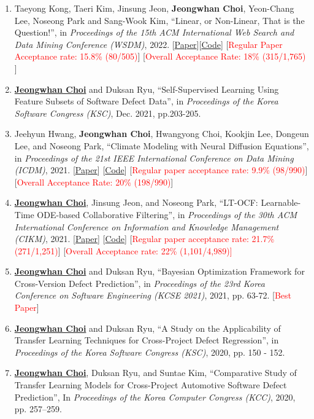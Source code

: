 \documentclass[10pt]{article}
\newenvironment{changemargin}[2]{
  \begin{list}{}{
    \setlength{\topsep}{0pt}
    \setlength{\leftmargin}{#1}
    \setlength{\rightmargin}{#2}
    \setlength{\listparindent}{\parindent}
    \setlength{\itemindent}{\parindent}
    \setlength{\parsep}{\parskip}
  }
  \item[]}{\end{list}
}
\newcommand{\RED}[1]{\textcolor{red}{#1}}
\newcommand{\textbu}[1]{\underline{\textbf{#1}}}
\newenvironment{body} {
	\vspace*{-16pt}
	\begin{changemargin}{-0.25in}{-0.5in}
  }
	{\end{changemargin}
}
\begin{document}
\begin{body}
\begin{enumerate}
    \item Taeyong Kong, Taeri Kim, Jinsung Jeon, \textbf{Jeongwhan Choi}, Yeon-Chang Lee, Noseong Park and Sang-Wook Kim, ``Linear, or Non-Linear, That is the Question!'', in \textit{Proceedings of the 15th ACM International Web Search and Data Mining Conference (WSDM)}, 2022.  [\href{https://arxiv.org/abs/2111.07265}{Paper}][\href{https://github.com/jeongwhanchoi/HMLET}{Code}] [\RED{Regular Paper Acceptance rate: 15.8\% (80/505)}] [\RED{Overall Acceptance Rate: 18\%  (315/1,765)} ]
    \item \textbu{Jeongwhan Choi} and Duksan Ryu, ``Self-Supervised Learning Using Feature Subsets of Software Defect Data'',  in \emph{Proceedings of the Korea Software Congress (KSC)}, Dec. 2021, pp.203-205.
    \item Jeehyun Hwang, \textbf{Jeongwhan Choi}, Hwangyong Choi, Kookjin Lee, Dongeun Lee, and Noseong Park, ``Climate Modeling with Neural Diffusion Equations'', in \emph{Proceedings of the 21st IEEE International Conference on Data Mining (ICDM)}, 2021.  [\href{https://arxiv.org/abs/2111.06011}{Paper}] [\href{https://github.com/jeongwhanchoi/Neural-Diffusion-Equation}{Code}] [\RED{Regular paper acceptance rate: 9.9\%  (98/990)}] [\RED{Overall Acceptance Rate: 20\%  (198/990)}]
    \item \textbu{Jeongwhan Choi}, Jinsung Jeon, and Noseong Park, ``LT-OCF: Learnable-Time ODE-based Collaborative Filtering'', in \emph{Proceedings of the 30th ACM International Conference on Information and Knowledge Management (CIKM)}, 2021. [\href{https://arxiv.org/pdf/2108.06208.pdf}{Paper}] [\href{https://github.com/jeongwhanchoi/LT-OCF}{Code}]  [\RED{Regular paper acceptance rate: 21.7\% (271/1,251)}]  [\RED{Overall Acceptance rate: 22\% (1,101/4,989)]}
    \item \textbu{Jeongwhan Choi} and Duksan Ryu, ``Bayesian Optimization Framework for Cross-Version Defect Prediction'', in \emph{Proceedings of the 23rd Korea Conference on Software Engineering (KCSE 2021)}, 2021, pp. 63-72.  [\RED{Best Paper}]
    \item \textbu{Jeongwhan Choi} and Duksan Ryu, ``A Study on the Applicability of Transfer Learning Techniques for Cross-Project Defect Regression'', in \emph{Proceedings of the Korea Software Congress (KSC)}, 2020, pp. 150 - 152.
    \item \textbu{Jeongwhan Choi}, Duksan Ryu, and Suntae Kim, ``Comparative Study of Transfer Learning Models for Cross-Project Automotive Software Defect Prediction'', In \emph{Proceedings of the Korea Computer Congress (KCC)}, 2020, pp. 257–259.

\end{enumerate}
\end{body}
\end{document}
